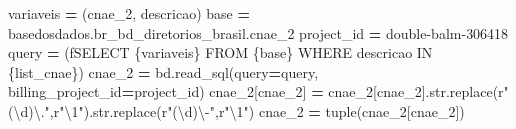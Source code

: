 \documentclass[
  12,
  dvipsnames]{article}
\newenvironment{Shaded}{\begin{snugshade}}{\end{snugshade}}
\newcommand{\BuiltInTok}[1]{#1}
\newcommand{\NormalTok}[1]{#1}
\newcommand{\OperatorTok}[1]{\textcolor[rgb]{0.81,0.36,0.00}{\textbf{#1}}}
\newcommand{\SpecialCharTok}[1]{\textcolor[rgb]{0.00,0.00,0.00}{#1}}
\newcommand{\SpecialStringTok}[1]{\textcolor[rgb]{0.31,0.60,0.02}{#1}}
\newcommand{\StringTok}[1]{\textcolor[rgb]{0.31,0.60,0.02}{#1}}
\newcommand{\VerbatimStringTok}[1]{\textcolor[rgb]{0.31,0.60,0.02}{#1}}
\begin{document}
\begin{Shaded}
\begin{Highlighting}[]
\NormalTok{variaveis }\OperatorTok{=}\NormalTok{ (}\StringTok{\textquotesingle{}cnae\_2, descricao\textquotesingle{}}\NormalTok{)}
\NormalTok{base }\OperatorTok{=} \StringTok{\textquotesingle{}\textasciigrave{}basedosdados.br\_bd\_diretorios\_brasil.cnae\_2\textasciigrave{}\textquotesingle{}}
\NormalTok{project\_id }\OperatorTok{=} \StringTok{\textquotesingle{}double{-}balm{-}306418\textquotesingle{}}
\NormalTok{query }\OperatorTok{=}\NormalTok{ (}\SpecialStringTok{f\textquotesingle{}SELECT }\SpecialCharTok{\{}\NormalTok{variaveis}\SpecialCharTok{\}}\SpecialStringTok{ FROM }\SpecialCharTok{\{}\NormalTok{base}\SpecialCharTok{\}}\SpecialStringTok{ WHERE descricao IN }\SpecialCharTok{\{}\NormalTok{list\_cnae}\SpecialCharTok{\}}\SpecialStringTok{\textquotesingle{}}\NormalTok{)}
\NormalTok{cnae\_2 }\OperatorTok{=}\NormalTok{ bd.read\_sql(query}\OperatorTok{=}\NormalTok{query, billing\_project\_id}\OperatorTok{=}\NormalTok{project\_id)}
\NormalTok{cnae\_2[}\StringTok{\textquotesingle{}cnae\_2\textquotesingle{}}\NormalTok{] }\OperatorTok{=}\NormalTok{ cnae\_2[}\StringTok{\textquotesingle{}cnae\_2\textquotesingle{}}\NormalTok{].}\BuiltInTok{str}\NormalTok{.replace(}\VerbatimStringTok{r"(\textbackslash{}d)\textbackslash{}."}\NormalTok{,}\VerbatimStringTok{r"\textbackslash{}1"}\NormalTok{).}\BuiltInTok{str}\NormalTok{.replace(}\VerbatimStringTok{r"(\textbackslash{}d)\textbackslash{}{-}"}\NormalTok{,}\VerbatimStringTok{r"\textbackslash{}1"}\NormalTok{)}
\NormalTok{cnae\_2 }\OperatorTok{=} \BuiltInTok{tuple}\NormalTok{(cnae\_2[}\StringTok{\textquotesingle{}cnae\_2\textquotesingle{}}\NormalTok{])}


\end{Highlighting}
\end{Shaded}
\end{document}
